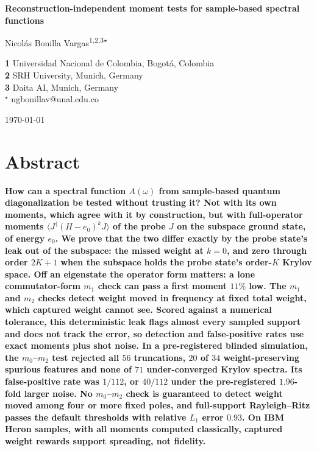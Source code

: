 \documentclass[submission, PhysCore]{SciPost}
\begin{document}
\begin{center}{\Large \textbf{
Reconstruction-independent moment tests for sample-based spectral functions
}}\end{center}

\begin{center}
Nicol\'as Bonilla Vargas\textsuperscript{1,2,3$\star$}
\end{center}

\begin{center}
{\bf 1} Universidad Nacional de Colombia, Bogot\'a, Colombia
\\
{\bf 2} SRH University, Munich, Germany
\\
{\bf 3} Daita AI, Munich, Germany
\\
${}^\star$ {\small \sf ngbonillav@unal.edu.co}
\end{center}

\begin{center}
\today
\end{center}

\linenumbers


\section*{Abstract}
{\bf
How can a spectral function $A(\omega)$ from sample-based quantum diagonalization be tested without trusting it? Not with its own moments, which agree with it by construction, but with full-operator moments ${\langle J^\dagger(H-e_0)^kJ\rangle}$ of the probe $J$ on the subspace ground state, of energy $e_0$. We prove that the two differ exactly by the probe state's leak out of the subspace: the missed weight at $k=0$, and zero through order $2K+1$ when the subspace holds the probe state's order-$K$ Krylov space. Off an eigenstate the operator form matters: a lone commutator-form $m_1$ check can pass a first moment $11\%$ low. The $m_1$ and $m_2$ checks detect weight moved in frequency at fixed total weight, which captured weight cannot see. Scored against a numerical tolerance, this deterministic leak flags almost every sampled support and does not track the error, so detection and false-positive rates use exact moments plus shot noise. In a pre-registered blinded simulation, the \mbox{$m_0$--$m_2$} test rejected all $56$ truncations, $20$ of $34$ weight-preserving spurious features and none of $71$ under-converged Krylov spectra. Its false-positive rate was $1/112$, or $40/112$ under the pre-registered $1.96$-fold larger noise. No \mbox{$m_0$--$m_2$} check is guaranteed to detect weight moved among four or more fixed poles, and full-support Rayleigh--Ritz passes the default thresholds with relative $L_1$ error $0.93$. On IBM Heron samples, with all moments computed classically, captured weight rewards support spreading, not fidelity.
}
\end{document}
